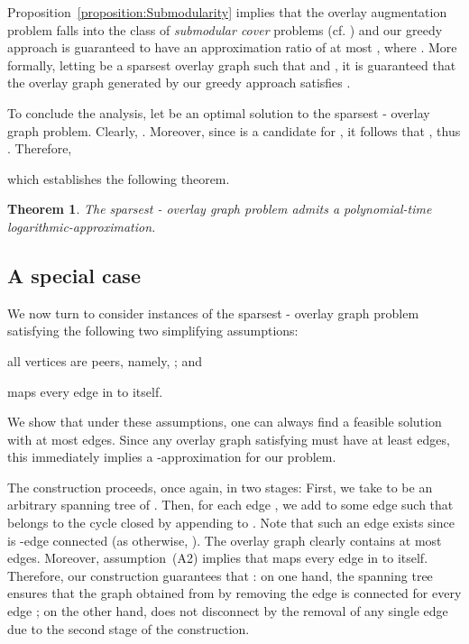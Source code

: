 \LongVersion \documentclass[11pt]{article}
\newtheorem{theorem}{Theorem}[section]
\theoremstyle{definition}
\theoremstyle{plain}
\newcounter{smallitemizec}
\newenvironment{smallitemize}
{   \setcounter{smallitemizec}{0}
    \vspace{-0.5ex}
  \begin{list}{}
    {\usecounter{smallitemizec}
      \setlength{\parsep}{0pt}
      \setlength{\itemsep}{0pt}}
    }{ \end{list}
   \vspace{-0.5ex}
}
\begin{document}
Proposition~\ref{proposition:Submodularity} implies that the overlay
augmentation problem falls into the class of \emph{submodular cover} problems
(cf. \cite{W82,BKP01}) and our greedy approach is guaranteed to have an
approximation ratio of at most , where .
More formally, letting  be a sparsest overlay graph such that
 and , it is guaranteed that the
overlay graph  generated by our greedy approach satisfies
.

To conclude the analysis, let  be an optimal solution to the sparsest
- overlay graph problem.
Clearly, .
Moreover, since  is a candidate for , it
follows that , thus .
Therefore,

which establishes the following theorem.

\begin{theorem} \label{theorem:ApproximationSparsestERDC}
The sparsest - overlay graph problem admits a polynomial-time
logarithmic-approximation.
\end{theorem}

\subsection{A special case}


We now turn to consider instances of the sparsest - overlay graph
problem satisfying the following two simplifying assumptions:
\begin{smallitemize}
\item[(1)] all vertices are peers, namely, ; and
\item[(2)]  maps every edge in  to itself.
\end{smallitemize}
We show that under these assumptions, one can always find a feasible solution
with at most  edges.
Since any overlay graph  satisfying  must have at least
 edges, this immediately implies a -approximation for our problem.

\LongVersion The construction proceeds, once again, in two stages:
First, we take  to be an arbitrary spanning tree  of .
Then, for each edge , we add to  some edge  such that  belongs to the cycle closed by appending  to .
Note that such an edge  exists since  is -edge connected (as
otherwise, ).
The overlay graph  clearly contains at most  edges.
Moreover, assumption~(A2) implies that  maps every edge in 
to itself.
Therefore, our construction guarantees that :
on one hand, the spanning tree  ensures that the graph obtained from  by
removing the edge  is connected for every edge ;
on the other hand,  does not disconnect by the removal of any single edge
 due to the second stage of the construction.
\LongVersionEnd 
\end{document}
